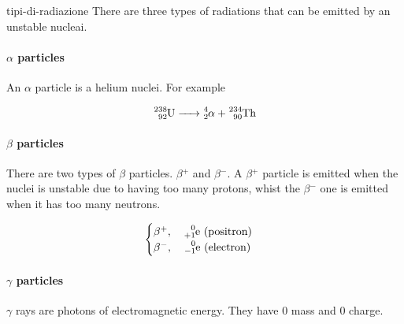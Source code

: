 \documentclass[preview]{standalone}
\begin{document}
\begin{snippet}{tipi-di-radiazione}
There are three types of radiations that can be emitted by an unstable nucleai.

\paragraph{\(\alpha\) particles}

An \(\alpha\) particle is a helium nuclei. For example

\[
    \ce{^238_92U -> ^4_2\alpha{} + ^234_90Th}
\]

\paragraph{\(\beta\) particles}

There are two types of \(\beta{}\) particles. \(\beta{}^+\) and \(\beta{}^-\).
A \(\beta{}^+\) particle is emitted when the nuclei is unstable due to
having too many protons, whist the \(\beta{}^-\) one is emitted when it has
too many neutrons.

\[
    \begin{cases}
        \beta{}^+,\quad \ce{^0_{+1}e} \text{ (positron)} \\
        \beta{}^-,\quad \ce{^0_{-1}e} \text{ (electron)}
    \end{cases}
\]

\paragraph{\(\gamma\) particles}

\(\gamma\) rays are photons of electromagnetic energy. They have \(0\) mass and \(0\) charge.
\end{snippet}
\end{document}
